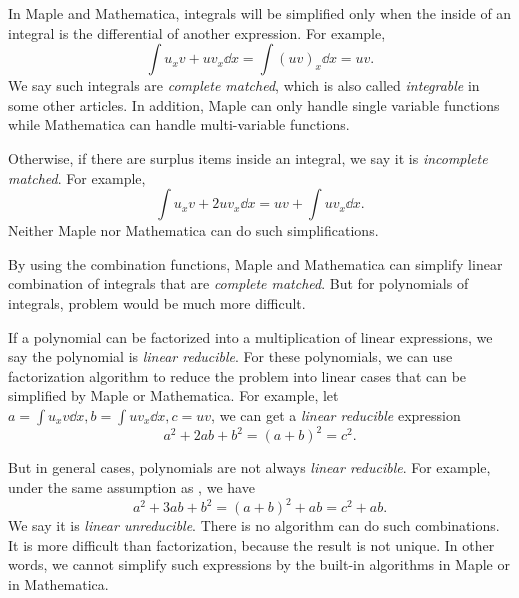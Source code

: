 In Maple and Mathematica, integrals will be simplified only when the inside of an integral is the differential of another expression. For example, 
\begin{equation}
\int\!{u_xv+uv_x \dd x}=\int\!{(uv)_x\dd x}=uv.
\label{complete_matched}
\end{equation}
We say such integrals are \emph{complete matched}, which is also called \emph{integrable} in some other articles. In addition, Maple can only handle single variable functions while Mathematica can handle multi-variable functions. 

Otherwise, if there are surplus items inside an integral, we say it is \emph{incomplete matched}. For example,
\begin{equation}
\int\!{u_xv+2uv_x \dd x}=uv+\int\!{uv_x\dd x}.
\label{incomplete_matched}
\end{equation}
Neither Maple nor Mathematica can do such simplifications. 

By using the combination functions, Maple and Mathematica can simplify linear combination of integrals that are \emph{complete matched}. But for polynomials of integrals, problem would be much more difficult. 

If a polynomial can be factorized into a multiplication of linear expressions, we say the polynomial is \emph{linear reducible}. For these polynomials, we can use factorization algorithm to reduce the problem into linear cases that can be simplified by Maple or Mathematica. For example, let $a=\int{u_x v \dd x},b=\int{u v_x \dd x},c=uv$, we can get a \emph{linear reducible} expression
\begin{equation}
a^2+2ab+b^2=(a+b)^2=c^2.
\label{liner_reducible}
\end{equation}

But in general cases, polynomials are not always \emph{linear reducible}. For example, under the same assumption as  , we have
\begin{equation}
a^2+3ab+b^2=(a+b)^2+ab=c^2+ab.
\label{non_linear_reducible}
\end{equation} 
We say it is \emph{linear unreducible}. There is no algorithm can do such combinations. It is more difficult than factorization, because the result is not unique. In other words, we cannot simplify such expressions by the built-in algorithms in Maple or in  Mathematica. 

